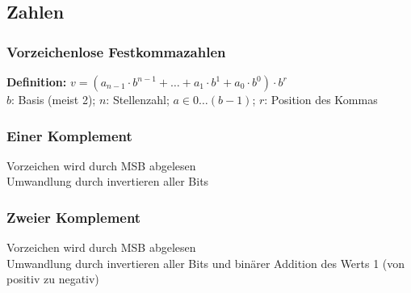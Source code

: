 \documentclass[german]{latex4ei/latex4ei_sheet}
\begin{document}
	\subsection{Zahlen}
	\subsubsection{Vorzeichenlose Festkommazahlen}
	\textbf{Definition:} $v=(a_{n-1} \cdot b^{n-1}+\dots+a_1 \cdot b^1 + a_0 \cdot b^0) \cdot b^r$\\
	$b$: Basis (meist 2); $n$: Stellenzahl; $a \in 0 \dots (b-1)$; $r$: Position des Kommas
	\subsubsection{Einer Komplement}
	Vorzeichen wird durch MSB abgelesen\\
	Umwandlung durch invertieren aller Bits
	\subsubsection{Zweier Komplement}
	Vorzeichen wird durch MSB abgelesen\\
	Umwandlung durch invertieren aller Bits und binärer Addition des Werts 1 (von positiv zu negativ)
\end{document}
